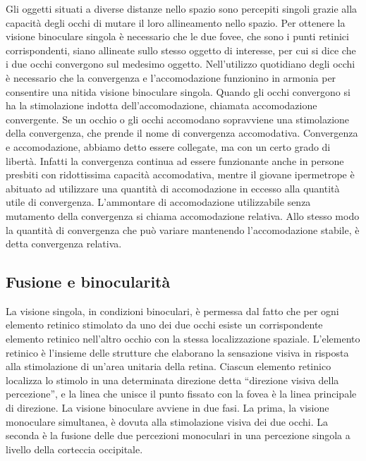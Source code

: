 Gli oggetti situati a diverse distanze nello spazio sono percepiti singoli grazie alla capacità degli occhi di mutare il loro allineamento nello spazio. Per ottenere la visione binoculare singola è necessario che le due fovee, che sono i punti retinici corrispondenti, siano allineate sullo stesso oggetto di interesse, per cui si dice che i due occhi convergono sul medesimo oggetto. Nell’utilizzo quotidiano degli occhi è necessario che la convergenza e l’accomodazione funzionino in armonia per consentire una nitida visione binoculare singola. Quando gli occhi convergono si ha la stimolazione indotta dell’accomodazione, chiamata accomodazione convergente. Se un occhio o gli occhi accomodano sopravviene una stimolazione della convergenza, che prende il nome di convergenza accomodativa. Convergenza e accomodazione, abbiamo detto essere collegate, ma con un certo grado di libertà. Infatti la convergenza continua ad essere funzionante anche in persone presbiti con ridottissima capacità accomodativa, mentre il giovane ipermetrope è abituato ad utilizzare una quantità di accomodazione in eccesso alla quantità utile di convergenza. L’ammontare di accomodazione utilizzabile senza mutamento della convergenza si chiama accomodazione relativa. Allo stesso modo la quantità di convergenza che può variare mantenendo l’accomodazione stabile, è detta convergenza relativa.



\subsection{Fusione e binocularità}

La visione singola, in condizioni binoculari, è permessa dal fatto che per ogni elemento retinico stimolato da uno dei due occhi esiste un corrispondente elemento retinico nell’altro occhio con la stessa localizzazione spaziale. L’elemento retinico è l’insieme delle strutture che elaborano la sensazione visiva in risposta alla stimolazione di un’area unitaria della retina. Ciascun elemento retinico localizza lo stimolo in una determinata direzione detta “direzione visiva della percezione”, e la linea che unisce il punto fissato con la fovea è la linea principale di direzione.
La visione binoculare avviene in due fasi. La prima, la visione monoculare simultanea, è dovuta alla stimolazione visiva dei due occhi. La seconda è la fusione delle due percezioni monoculari in una percezione singola a livello della corteccia occipitale.

